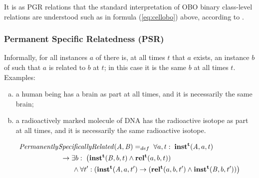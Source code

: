 It is as PGR relations that the standard interpretation of OBO binary class-level relations are understood 
such as in formula (\ref{eq:cellobo}) above, according to \cite{OBO:RO}.

\subsubsection*{Permanent Specific Relatedness (PSR)}

Informally, for all instances $a$ of  there is, at all times $t$ that $a$ exists, an
instance $b$ of  such that $a$ is related to $b$ at $t$; in this case it is the
same $b$ at all times $t$. Examples:
\begin{enumerate}[(a)]
\item a human being has a brain as part at all times, and it is necessarily the same brain;
\item a radioactively marked molecule of DNA has the radioactive isotope as part
at all times, and it is necessarily the same radioactive isotope.
\end{enumerate}

\begin{equation}
\begin{split}
\mathit{Permanently}&\mathit{SpecificallyRelated}(\mathit{A},\mathit{B}) =_{def}\;
\forall a, t:\; \mathrm{\mathbf{inst^t}}(\mathit{A}, a, t) \\
&\ \rightarrow
\exists b:\;\big(\mathrm{\mathbf{inst^t}}(\mathit{B},b,t) \wedge
\mathrm{\mathbf{rel^t}}(a,b,t))
\\
&\quad\quad \wedge \forall t^\prime: (\mathrm{\mathbf{inst^t}}(\mathit{A},a,t^\prime)
\rightarrow (\mathrm{\mathbf{rel^t}}(a,b,t^\prime) \wedge
\mathrm{\mathbf{inst^t}}(\mathit{B},b,t^\prime))\big)
\end{split}
\label{eq:specifically:cls}
\end{equation}

